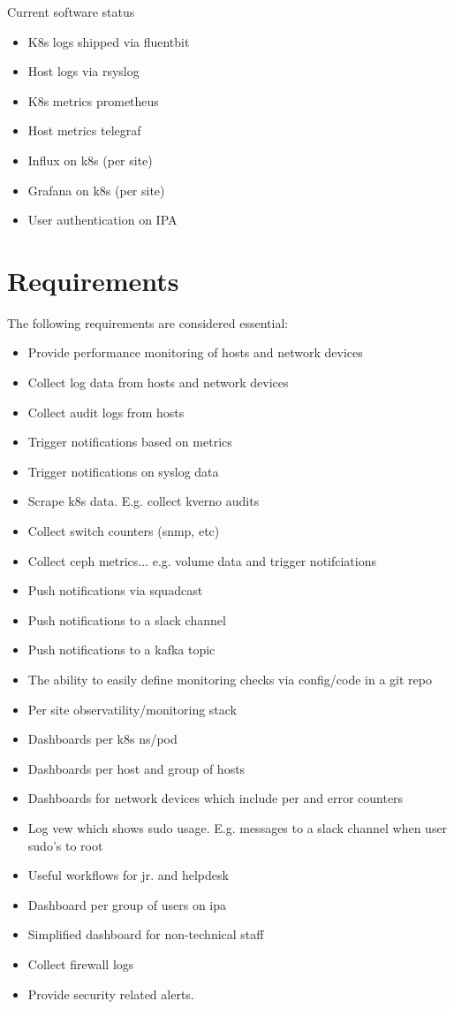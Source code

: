 Current software status

\begin{itemize}
    \item K8s logs shipped via fluentbit
    \item Host logs via rsyslog
    \item K8s metrics prometheus
    \item Host metrics telegraf
    \item Influx on k8s (per site)
    \item Grafana on k8s (per site)
    \item User authentication on IPA
\end{itemize}  

\section{Requirements}

The following requirements are considered essential:

\begin{itemize}
    \item Provide performance monitoring of hosts and network devices 
    \item Collect log data from hosts and network devices
    \item Collect audit logs from hosts
    \item Trigger notifications based on metrics
    \item Trigger notifications on syslog data
    \item Scrape k8s data. E.g. collect kverno audits
    \item Collect switch counters (snmp, etc)
    \item Collect ceph metrics... e.g. volume data and trigger notifciations
    \item Push notifications via squadcast
    \item Push notifications to a slack channel
    \item Push notifications to a kafka topic
    \item The ability to easily define monitoring checks via config/code in a git repo
    \item Per site observatility/monitoring stack
    \item Dashboards per k8s ns/pod
    \item Dashboards per host and group of hosts
    \item Dashboards for network devices which include per and error counters
    \item Log vew which shows sudo usage. E.g. messages to a slack channel when user sudo's to root
    \item Useful workflows for jr. and helpdesk
    \item Dashboard per group of users on ipa 
    \item Simplified dashboard for non-technical staff
    \item Collect firewall logs
    \item Provide security related alerts. 
\end{itemize} 

